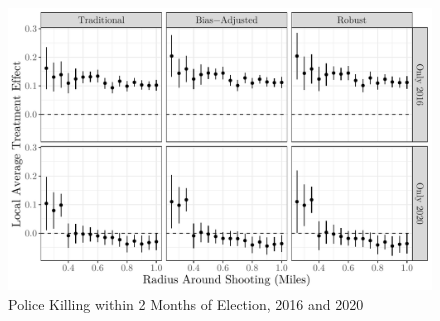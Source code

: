 \documentclass[
  12pt,
]{article}
\begin{document}
\begin{figure}[h]

{\centering \includegraphics{shoot_to_files/figure-latex/individ-years-1} 

}

\caption{\label{fig:map}Police Killing within 2 Months of Election, 2016 and 2020}\label{fig:individ-years}
\end{figure}
\end{document}
